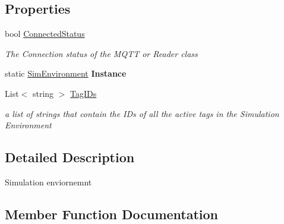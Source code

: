 \subsection*{Properties}
\begin{DoxyCompactItemize}
\item 
bool \hyperlink{class_pozyx_positioner_1_1_framework_1_1_sim_environment_ae0d0d204695b423669bd6d0593d961aa}{Connected\+Status}
\begin{DoxyCompactList}\small\item\em The Connection status of the M\+Q\+TT or Reader class \end{DoxyCompactList}\item 
\mbox{\label{class_pozyx_positioner_1_1_framework_1_1_sim_environment_a099b83d9b2af93ae755b7bd081bef37c}} 
static \hyperlink{class_pozyx_positioner_1_1_framework_1_1_sim_environment}{Sim\+Environment} {\bfseries Instance}
\item 
List$<$ string $>$ \hyperlink{class_pozyx_positioner_1_1_framework_1_1_sim_environment_af1e5db7ec810b6d92216b74c3eeb657a}{Tag\+I\+Ds}
\begin{DoxyCompactList}\small\item\em a list of strings that contain the I\+Ds of all the active tags in the Simulation Environment \end{DoxyCompactList}\end{DoxyCompactItemize}


\subsection{Detailed Description}
Simulation enviornemnt 



\subsection{Member Function Documentation}
\mbox{\label{class_pozyx_positioner_1_1_framework_1_1_sim_environment_a2163b3c6c4794224ceba0e5279b7ee8e}} 
